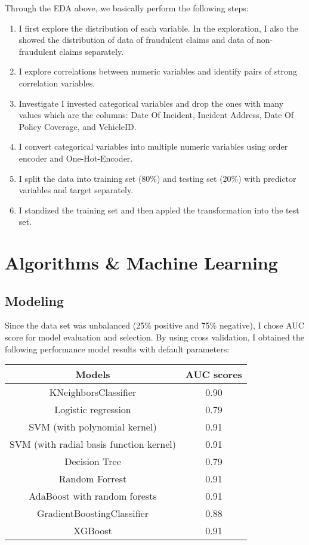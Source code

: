 \documentclass[oneside,12pt,reqno]{amsart}
\theoremstyle{definition}
\begin{document}
Through the EDA above, we basically perform the following steps:

\begin{enumerate}
    \item I first explore the distribution of each variable. In the exploration, I also  the showed the distribution of data of fraudulent claims and data of non-fraudulent claims separately.
    \item I explore correlations between numeric variables and identify pairs of strong correlation variables.
    \item Investigate I invested categorical variables and drop the ones with many values which are the columns: Date Of Incident, Incident Address, Date Of Policy Coverage, and VehicleID.
    \item I convert categorical variables into multiple numeric variables using order encoder and One-Hot-Encoder.
    \item I split the data into training set (80\%) and testing set (20\%)  with predictor variables and target separately.
    \item I standized the training set and then appled the transformation into the test set.
\end{enumerate}

\section{Algorithms \& Machine Learning}
\subsection{Modeling}

Since the data set was unbalanced (25\% positive and 75\% negative), I chose AUC score for model evaluation and selection. By using cross validation, I obtained the following performance model results with default parameters: 

\vspace{0.2in}

\begin{center}
\begin{tabular}{||c c||} 
 \hline
 Models & AUC scores\\ [0.5ex] 
 \hline\hline
 KNeighborsClassifier & 0.90 \\ 
 \hline
 Logistic regression & 0.79 \\
 \hline
 SVM (with polynomial kernel) & 0.91 \\
 \hline
 SVM (with radial basis function kernel) & 0.91 \\
 \hline
 Decision Tree & 0.79\\
 \hline
 Random Forrest & 0.91 \\ 
 \hline
 AdaBoost with random forests & 0.91\\
 \hline
 GradientBoostingClassifier & 0.88\\
 \hline
 XGBoost & 0.91\\
 \hline
\end{tabular}
\end{center}
\end{document}
